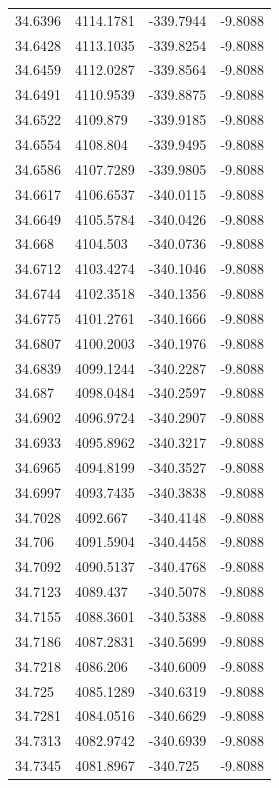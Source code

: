 \begin{table}[H]
\begin{tabular}{llll}
34.6396 & 4114.1781 & -339.7944 & -9.8088 \\
34.6428 & 4113.1035 & -339.8254 & -9.8088 \\
34.6459 & 4112.0287 & -339.8564 & -9.8088 \\
34.6491 & 4110.9539 & -339.8875 & -9.8088 \\
34.6522 & 4109.879 & -339.9185 & -9.8088 \\
34.6554 & 4108.804 & -339.9495 & -9.8088 \\
34.6586 & 4107.7289 & -339.9805 & -9.8088 \\
34.6617 & 4106.6537 & -340.0115 & -9.8088 \\
34.6649 & 4105.5784 & -340.0426 & -9.8088 \\
34.668 & 4104.503 & -340.0736 & -9.8088 \\
34.6712 & 4103.4274 & -340.1046 & -9.8088 \\
34.6744 & 4102.3518 & -340.1356 & -9.8088 \\
34.6775 & 4101.2761 & -340.1666 & -9.8088 \\
34.6807 & 4100.2003 & -340.1976 & -9.8088 \\
34.6839 & 4099.1244 & -340.2287 & -9.8088 \\
34.687 & 4098.0484 & -340.2597 & -9.8088 \\
34.6902 & 4096.9724 & -340.2907 & -9.8088 \\
34.6933 & 4095.8962 & -340.3217 & -9.8088 \\
34.6965 & 4094.8199 & -340.3527 & -9.8088 \\
34.6997 & 4093.7435 & -340.3838 & -9.8088 \\
34.7028 & 4092.667 & -340.4148 & -9.8088 \\
34.706 & 4091.5904 & -340.4458 & -9.8088 \\
34.7092 & 4090.5137 & -340.4768 & -9.8088 \\
34.7123 & 4089.437 & -340.5078 & -9.8088 \\
34.7155 & 4088.3601 & -340.5388 & -9.8088 \\
34.7186 & 4087.2831 & -340.5699 & -9.8088 \\
34.7218 & 4086.206 & -340.6009 & -9.8088 \\
34.725 & 4085.1289 & -340.6319 & -9.8088 \\
34.7281 & 4084.0516 & -340.6629 & -9.8088 \\
34.7313 & 4082.9742 & -340.6939 & -9.8088 \\
34.7345 & 4081.8967 & -340.725 & -9.8088 \\

\end{tabular}
\end{table}
